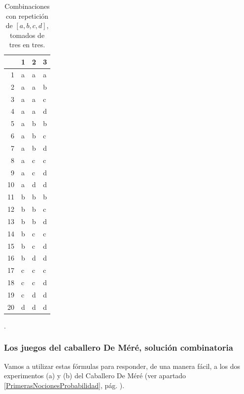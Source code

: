 \begin{table}[ht]
\centering
\begin{tabular}{rlll}
  \hline
 & 1 & 2 & 3 \\
  \hline
1 & a & a & a \\
  2 & a & a & b \\
  3 & a & a & c \\
  4 & a & a & d \\
  5 & a & b & b \\
  6 & a & b & c \\
  7 & a & b & d \\
  8 & a & c & c \\
  9 & a & c & d \\
  10 & a & d & d \\
  11 & b & b & b \\
  12 & b & b & c \\
  13 & b & b & d \\
  14 & b & c & c \\
  15 & b & c & d \\
  16 & b & d & d \\
  17 & c & c & c \\
  18 & c & c & d \\
  19 & c & d & d \\
  20 & d & d & d \\
   \hline
\end{tabular}
\caption{Combinaciones con repetición de $[a,b,c,d]$, tomados de tres en tres.}\label{cap03:tabla:CombinacionesRepeticion}.
\end{table}





\subsubsection{Los juegos del caballero De Méré, solución combinatoria}
\label{cap03:subsubsec:JuegosDeMereCombinatoria}

Vamos a utilizar estas fórmulas para responder, de una manera fácil, a los dos experimentos (a) y (b) del Caballero De Méré (ver apartado \ref{PrimerasNocionesProbabilidad}, pág. \pageref{PrimerasNocionesProbabilidad}).


